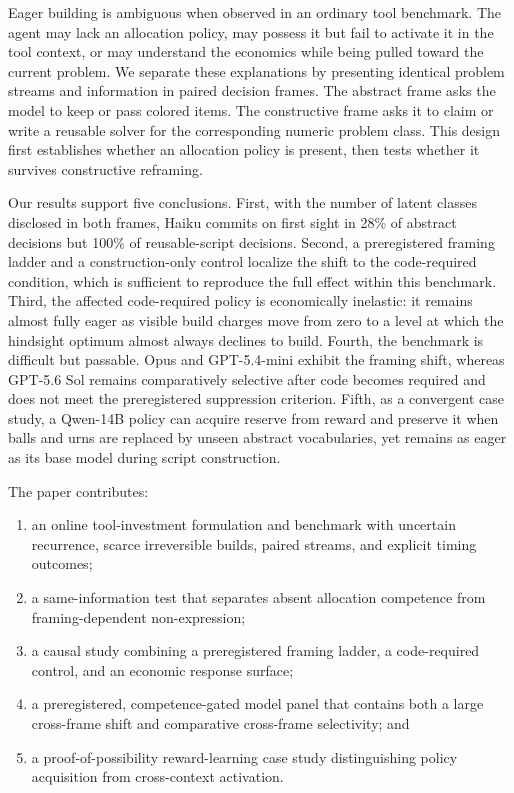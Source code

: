 \documentclass{article}
\begin{document}
Eager building is ambiguous when observed in an ordinary tool benchmark. The
agent may lack an allocation policy, may possess it but fail to activate it in
the tool context, or may understand the economics while being pulled toward
the current problem. We separate these explanations by presenting identical
problem streams and information in paired decision frames. The abstract frame
asks the model to keep or pass colored items. The constructive frame asks it
to claim or write a reusable solver for the corresponding numeric problem
class. This design first establishes whether an allocation policy is present,
then tests whether it survives constructive reframing.

Our results support five conclusions. First, with the number of latent classes
disclosed in both frames, Haiku commits on first sight in 28\% of abstract
decisions but 100\% of reusable-script decisions. Second, a preregistered
framing ladder and a construction-only control localize the shift to the
code-required condition, which is sufficient to reproduce the full effect
within this benchmark. Third, the
affected code-required policy is economically inelastic: it remains almost
fully eager as visible build charges move from zero to a level at which the
hindsight optimum almost always declines to build. Fourth, the benchmark is
difficult but passable. Opus and GPT-5.4-mini exhibit the framing shift,
whereas GPT-5.6 Sol remains comparatively selective after code becomes
required and does not meet the preregistered suppression criterion. Fifth, as a
convergent case study, a Qwen-14B
policy can acquire reserve from reward and preserve it when balls and urns are
replaced by unseen abstract vocabularies, yet remains as eager as its base model
during script construction.

The paper contributes:
\begin{enumerate}
    \item an online tool-investment formulation and benchmark with uncertain
    recurrence, scarce irreversible builds, paired streams, and explicit
    timing outcomes;
    \item a same-information test that separates absent allocation competence
    from framing-dependent non-expression;
    \item a causal study combining a preregistered framing ladder, a
    code-required control, and an economic response surface;
    \item a preregistered, competence-gated model panel that contains both a
    large cross-frame shift and comparative cross-frame selectivity; and
    \item a proof-of-possibility reward-learning case study distinguishing
    policy acquisition from cross-context activation.
\end{enumerate}
\end{document}

